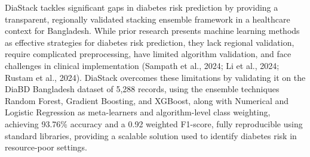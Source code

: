 \documentclass[conference, letterpaper]{IEEEtran}
\begin{document}
DiaStack tackles significant gaps in diabetes risk prediction by providing a transparent, regionally validated stacking ensemble framework in a healthcare context for Bangladesh. While prior research presents machine learning methods as effective strategies for diabetes risk prediction, they lack regional validation, require complicated preprocessing, have limited algorithm validation, and face challenges in clinical implementation (Sampath et al., 2024; Li et al., 2024; Rustam et al., 2024). DiaStack overcomes these limitations by validating it on the DiaBD Bangladesh dataset of 5,288 records, using the ensemble techniques Random Forest, Gradient Boosting, and XGBoost, along with Numerical and Logistic Regression as meta-learners and algorithm-level class weighting, achieving 93.76\% accuracy and a 0.92 weighted F1-score, fully reproducible using standard libraries, providing a scalable solution used to identify diabetes risk in resource-poor settings.
\\


\begin{table}[t]
\centering
\caption{Comparison of DiaStack with Related Works}
\label{tab:comparison}
\footnotesize
\renewcommand{\arraystretch}{1.2}
\setlength{\tabcolsep}{4pt}
\end{table}
\end{document}
